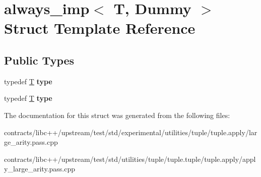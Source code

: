 \hypertarget{structalways__imp}{}\section{always\+\_\+imp$<$ T, Dummy $>$ Struct Template Reference}
\label{structalways__imp}
\subsection*{Public Types}
\begin{DoxyCompactItemize}
\item 
\mbox{\label{structalways__imp_ab37b3c6ea636cedc6483983967362ff0}} 
typedef \mbox{\hyperlink{struct_t}{T}} {\bfseries type}
\item 
\mbox{\label{structalways__imp_ab37b3c6ea636cedc6483983967362ff0}} 
typedef \mbox{\hyperlink{struct_t}{T}} {\bfseries type}
\end{DoxyCompactItemize}


The documentation for this struct was generated from the following files\+:\begin{DoxyCompactItemize}
\item 
contracts/libc++/upstream/test/std/experimental/utilities/tuple/tuple.\+apply/large\+\_\+arity.\+pass.\+cpp\item 
contracts/libc++/upstream/test/std/utilities/tuple/tuple.\+tuple/tuple.\+apply/apply\+\_\+large\+\_\+arity.\+pass.\+cpp\end{DoxyCompactItemize}
